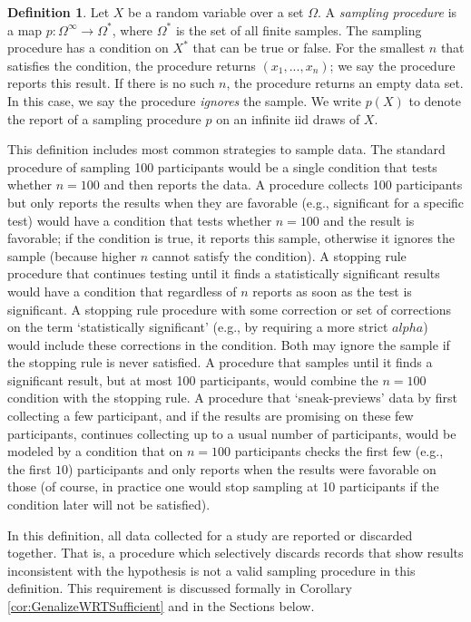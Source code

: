 \documentclass[man]{apa7}\usepackage[]{graphicx}\usepackage[]{xcolor}
\theoremstyle{definition}
\newtheorem{defn}[thm]{Definition}
\begin{document}
\begin{defn}
Let $X$ be a random variable over a set $\Omega$. A \emph{sampling procedure} is a map $p: \Omega^\infty \rightarrow \Omega^*$, where $\Omega^*$ is the set of all finite samples. The sampling procedure has a condition on $X^*$ that can be true or false. For the smallest $n$ that satisfies the condition, the procedure returns $(x_1,...,x_n)$; we say the procedure reports this result. If there is no such $n$, the procedure returns an empty data set. In this case, we say the procedure \emph{ignores} the sample. We write $p(X)$ to denote the report of a sampling procedure $p$ on an infinite iid draws of $X$.
\end{defn}

This definition includes most common strategies to sample data. The standard procedure of sampling 100 participants would be a single condition that tests whether $n=100$ and then reports the data. A procedure collects 100 participants but only reports the results when they are favorable (e.g., significant for a specific test) would have a condition that tests whether $n=100$ and the result is favorable; if the condition is true, it reports this sample, otherwise it ignores the sample (because higher $n$ cannot satisfy the condition). A stopping rule procedure that continues testing until it finds a statistically significant results would have a condition that regardless of $n$ reports as soon as the test is significant. A stopping rule procedure with some correction or set of corrections on the term `statistically significant' (e.g., by requiring a more strict $alpha$) would include these corrections in the condition. Both may ignore the sample if the stopping rule is never satisfied. A procedure that samples until it finds a significant result, but at most 100 participants, would combine the $n=100$ condition with the stopping rule. A procedure that `sneak-previews' data by first collecting a few participant, and if the results are promising on these few participants, continues collecting up to a usual number of participants, would be modeled by a condition that on $n=100$ participants checks the first few (e.g., the first $10$) participants and only reports when the results were favorable on those (of course, in practice one would stop sampling at 10 participants if the condition later will not be satisfied).

In this definition, all data collected for a study are reported or discarded together. That is, a procedure which selectively discards records that show results inconsistent with the hypothesis is not a valid sampling procedure in this definition. This requirement is discussed formally in Corollary \ref{cor:GenalizeWRTSufficient} and in the Sections below.
\end{document}
